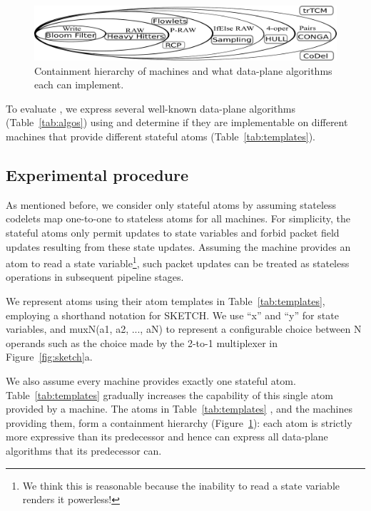 \begin{figure}[!t]
  \includegraphics[width=\textwidth]{atom_hierarchy.pdf}
  \caption{Containment hierarchy of \absmachine machines and what data-plane algorithms each can implement.}
\label{fig:eval}
\end{figure}

To evaluate \pktlanguage, we express several well-known data-plane algorithms
(Table~\ref{tab:algos}) using \pktlanguage and determine if they are
implementable on different \absmachine machines that provide different stateful
atoms (Table~\ref{tab:templates}).

\subsection{Experimental procedure}
As mentioned before, we consider only stateful atoms by assuming stateless
codelets map one-to-one to stateless atoms for all \absmachine machines. For
simplicity, the stateful atoms only permit updates to state variables and
forbid packet field updates resulting from these state updates.  Assuming the
\absmachine machine provides an atom to read a state variable\footnote{We think
this is reasonable because the inability to read a state variable renders it
powerless!}, such packet updates can be treated as stateless operations in
subsequent pipeline stages.

We represent atoms using their atom templates in Table~\ref{tab:templates},
employing a shorthand notation for SKETCH. We use ``x'' and ``y'' for state
variables, and muxN(a1, a2, ..., aN) to represent a configurable choice between
N operands such as the choice made by the 2-to-1 multiplexer in
Figure~\ref{fig:sketch}a.

We also assume every \absmachine machine provides exactly one stateful atom.
Table~\ref{tab:templates} gradually increases the capability of this single
atom provided by a \absmachine machine.  The atoms in Table~\ref{tab:templates}
, and the \absmachine machines providing them, form a containment hierarchy
(Figure~\ref{fig:eval}): each atom is strictly more expressive than its
predecessor and hence can express all data-plane algorithms that its
predecessor can.

